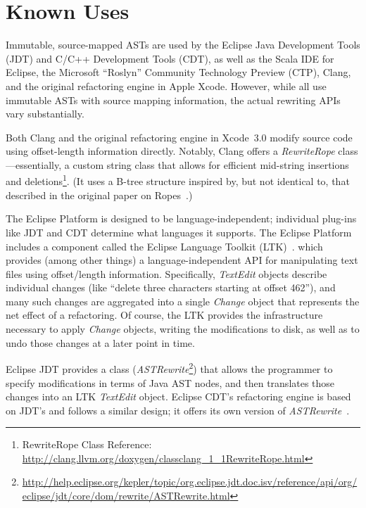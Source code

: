 \documentclass[prodmode]{acmlarge}
\begin{document}
\begin{itemize}
\end{itemize}


\section{Known Uses}

Immutable, source-mapped ASTs are used by the Eclipse Java Development Tools
(JDT) and C/C++ Development Tools (CDT), as well as the Scala IDE for Eclipse,
the Microsoft ``Roslyn'' Community Technology Preview (CTP), Clang, and the
original refactoring engine in Apple Xcode.  However, while all use immutable
ASTs with source mapping information, the actual rewriting APIs vary
substantially.  

Both Clang and the original refactoring engine in Xcode~3.0 modify source code
using offset-length information directly.  Notably, Clang offers a
\textit{RewriteRope} class---essentially, a custom string class that allows for
efficient mid-string insertions and
deletions\footnote{RewriteRope Class Reference: \url{http://clang.llvm.org/doxygen/classclang_1_1RewriteRope.html}}.
(It uses a B-tree structure inspired by, but not identical to, that described
in the original paper on Ropes~\cite{boehm95ropes}.)
 
The Eclipse Platform is designed to be language-independent; individual
plug-ins like JDT and CDT determine what languages it supports.  The Eclipse
Platform includes a component called the Eclipse Language Toolkit
(LTK)~\cite{ltk}.  which provides (among other things) a language-independent
API for manipulating text files using offset/length information.  Specifically,
\textit{TextEdit} objects describe individual changes (like ``delete three
characters starting at offset 462''), and many such changes are aggregated into
a single \textit{Change} object that represents the net effect of a
refactoring.  Of course, the LTK provides the infrastructure necessary to apply
\textit{Change} objects, writing the modifications to disk, as well as to undo
those changes at a later point in time.

Eclipse JDT provides a class (\textit{ASTRewrite}\footnote{\url{http://help.eclipse.org/kepler/topic/org.eclipse.jdt.doc.isv/reference/api/org/eclipse/jdt/core/dom/rewrite/ASTRewrite.html}}) that allows the programmer
to specify modifications in terms of Java AST nodes, and then translates those
changes into an LTK \textit{TextEdit} object.  Eclipse CDT's refactoring engine
is based on JDT's and follows a similar design; it offers its own version of
\textit{ASTRewrite}~\cite{cdt-refactoring}.
\end{document}
